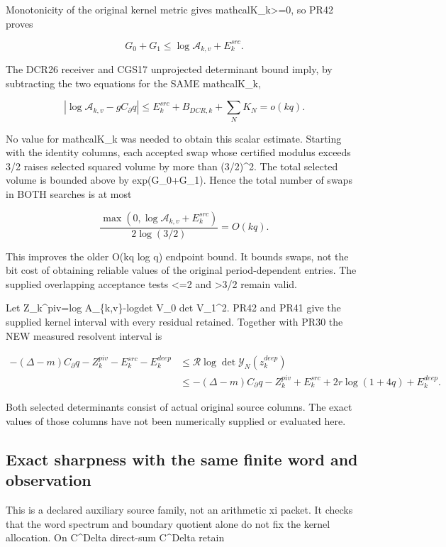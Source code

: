\documentclass[11pt]{article}
\begin{document}
Monotonicity of the original kernel metric gives mathcalK\_k\textgreater=0, so PR42 proves

\[
G_0+G_1\le\log\mathcal A_{k,v}+E_k^{src}.
\]

The DCR26 receiver and CGS17 unprojected determinant bound imply, by subtracting the two equations for the SAME mathcalK\_k,

\[
\left|\log\mathcal A_{k,v}-gC_\partial q\right|
\le E_k^{src}+B_{DCR,k}+\sum_N K_N=o(kq).
\]

No value for mathcalK\_k was needed to obtain this scalar estimate. Starting with the identity columns, each accepted swap whose certified modulus exceeds 3/2 raises selected squared volume by more than (3/2)\^{}2. The total selected volume is bounded above by exp(G\_0+G\_1). Hence the total number of swaps in BOTH searches is at most

\[
\boxed{
\frac{\max(0,\log\mathcal A_{k,v}+E_k^{src})}{2\log(3/2)}=O(kq).
}
\tag{PR43}
\]

This improves the older O(kq log q) endpoint bound. It bounds swaps, not the bit cost of obtaining reliable values of the original period-dependent entries. The supplied overlapping acceptance tests \textless=2 and \textgreater3/2 remain valid.

Let Z\_k\^{}piv=log A\_\{k,v\}-log\textbar det V\_0 det V\_1\textbar\^{}2. PR42 and PR41 give the supplied kernel interval with every residual retained. Together with PR30 the NEW measured resolvent interval is

\[
\boxed{
\begin{split}
-(\Delta-m)C_\partial q-Z_k^{piv}-E_k^{src}-E_k^{deep}
&\le\mathcal R\log\det\mathscr Y_N(z_k^{deep})\\
&\le-(\Delta-m)C_\partial q-Z_k^{piv}
+E_k^{src}+2r\log(1+4q)+E_k^{deep}.
\end{split}}
\tag{PR44}
\]

Both selected determinants consist of actual original source columns. The exact values of those columns have not been numerically supplied or evaluated here.

\subsection{Exact sharpness with the same finite word and observation}\label{exact-sharpness-with-the-same-finite-word-and-observation}

This is a declared auxiliary source family, not an arithmetic xi packet. It checks that the word spectrum and boundary quotient alone do not fix the kernel allocation. On C\^{}Delta direct-sum C\^{}Delta retain
\end{document}
